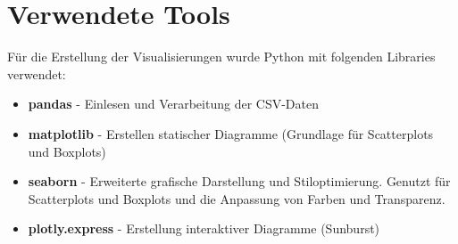 \documentclass[a4paper,12pt]{article}
\begin{document}
\section{Verwendete Tools}
Für die Erstellung der Visualisierungen wurde Python mit folgenden Libraries verwendet:

\begin{itemize}
  \item \textbf{pandas} - Einlesen und Verarbeitung der CSV-Daten
  \item \textbf{matplotlib} - Erstellen statischer Diagramme (Grundlage für Scatterplots und Boxplots) 
  \item \textbf{seaborn} - Erweiterte grafische Darstellung und Stiloptimierung.
    Genutzt für Scatterplots und Boxplots und die Anpassung von Farben und Transparenz.
  \item \textbf{plotly.express} - Erstellung interaktiver Diagramme (Sunburst)
\end{itemize}
\end{document}
